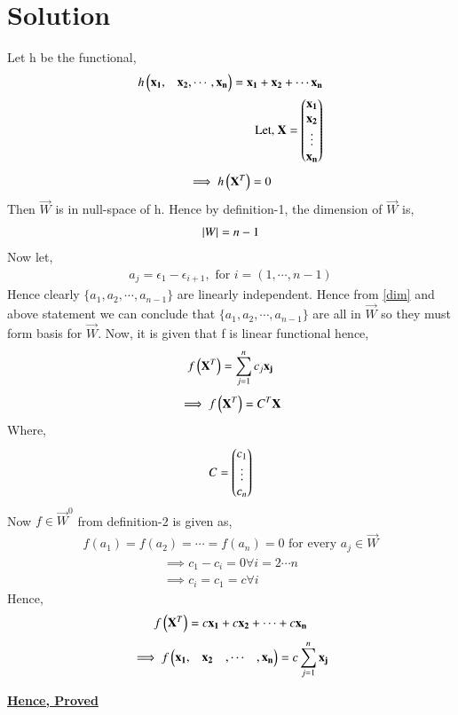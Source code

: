 \documentclass[journal,12pt,twocolumn]{IEEEtran}
\begin{document}
\section{Solution}
Let h be the functional,
\begin{align}
h\begin{pmatrix}\mathbf{x_1},&\mathbf{x_2},\cdots ,\mathbf{x_n}\end{pmatrix} = \mathbf{x_1}+\mathbf{x_2}+\cdots \mathbf{x_n}\\
\mbox{Let, } \mathbf{X} = \begin{pmatrix}\mathbf{x_1}\\\mathbf{x_2}\\\vdots\\\mathbf{x_n}\end{pmatrix}
\end{align}
\begin{align}
\implies h\left(\mathbf{X}^T\right) = 0
\end{align}
Then $\vec{W}$ is in null-space of h. Hence by definition-1, the dimension of $\vec{W}$ is,
\begin{align}
\left\vert W\right\vert = n - 1
\label{dim}
\end{align}
Now let, 
\begin{align}
a_j = \epsilon_1-\epsilon_{i+1}, \mbox{ for } i = (1,\cdots ,n-1)
\label{aj} 
\end{align}
Hence clearly $\{a_1, a_2, \cdots, a_{n-1}\}$ are linearly independent. Hence from \eqref{dim} and above statement we can conclude that $\{a_1, a_2, \cdots, a_{n-1}\}$ are all in $\vec{W}$ so they must form basis for $\vec{W}$. Now, it is given that f is linear functional hence,
\begin{align}
f\left(\mathbf{X}^T\right) = \sum_{j=1}^{n}c_j\mathbf{x_j}
\end{align}
\begin{align}
\implies f\left(\mathbf{X}^T\right) = C^T\mathbf{X}
\end{align}
Where,
\begin{align}
C = \begin{pmatrix}c_1\\\vdots\\c_n\end{pmatrix}
\end{align}
Now $f \in \vec{W}^0$ from definition-2 is given as,
\begin{align}
f(a_1) = f(a_2) = \cdots = f(a_n) = 0 \mbox{ for every } a_j \in \vec{W}
\end{align}
\begin{align}
\implies c_1 - c_i = 0 \forall i= 2\cdots n\\
\implies c_i = c_1 = c \forall i
\end{align}
Hence,
\begin{align}
f\begin{pmatrix}\mathbf{X}^T\end{pmatrix} = c\mathbf{x_1} + c\mathbf{x_2} + \cdots + c\mathbf{x_n}\\
\end{align}
\begin{align}
\implies f\begin{pmatrix}\mathbf{x_1},&\mathbf{x_2}&,\cdots &,\mathbf{x_n}\end{pmatrix} = c\sum_{j=1}^{n}\mathbf{x_j}
\end{align}
\centerline{\uline{\bfseries Hence, Proved}}
\end{document}
